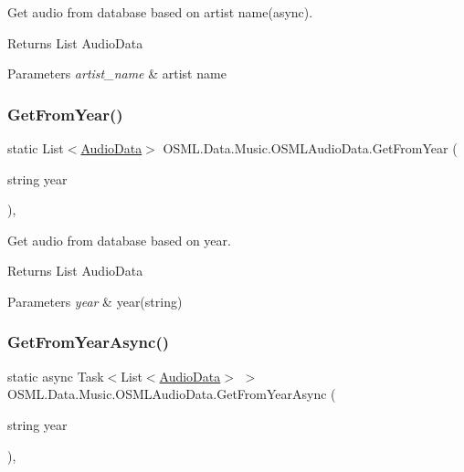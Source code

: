 Get audio from database based on artist name(async). 

\begin{DoxyReturn}{Returns}
List Audio\+Data 
\end{DoxyReturn}

\begin{DoxyParams}{Parameters}
{\em artist\+\_\+name} & artist name\\
\hline
\end{DoxyParams}
\mbox{\label{classOSML_1_1Data_1_1Music_1_1OSMLAudioData_aa160a8b1b2b06fdd9f83ec3d5dc03462}} 
\subsubsection{\texorpdfstring{GetFromYear()}{GetFromYear()}}
{\footnotesize\ttfamily static List$<$\mbox{\hyperlink{classOSML_1_1Media_1_1AudioData}{Audio\+Data}}$>$ O\+S\+M\+L.\+Data.\+Music.\+O\+S\+M\+L\+Audio\+Data.\+Get\+From\+Year (\begin{DoxyParamCaption}\item[{string}]{year }\end{DoxyParamCaption})\hspace{0.3cm}{\ttfamily [inline]}, {\ttfamily [static]}}



Get audio from database based on year. 

\begin{DoxyReturn}{Returns}
List Audio\+Data 
\end{DoxyReturn}

\begin{DoxyParams}{Parameters}
{\em year} & year(string)\\
\hline
\end{DoxyParams}
\mbox{\label{classOSML_1_1Data_1_1Music_1_1OSMLAudioData_a8bd87ed0b02589733ded4479175eac5e}} 
\subsubsection{\texorpdfstring{GetFromYearAsync()}{GetFromYearAsync()}}
{\footnotesize\ttfamily static async Task$<$List$<$\mbox{\hyperlink{classOSML_1_1Media_1_1AudioData}{Audio\+Data}}$>$ $>$ O\+S\+M\+L.\+Data.\+Music.\+O\+S\+M\+L\+Audio\+Data.\+Get\+From\+Year\+Async (\begin{DoxyParamCaption}\item[{string}]{year }\end{DoxyParamCaption})\hspace{0.3cm}{\ttfamily [inline]}, {\ttfamily [static]}}




